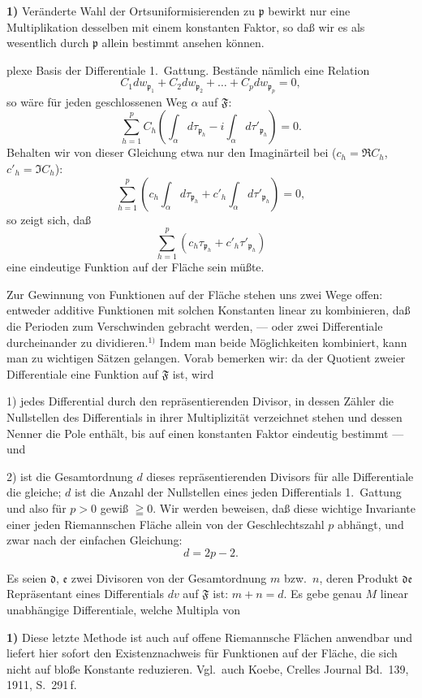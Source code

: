 \documentclass{article}
\begin{document}
\textbf{1)} Veränderte Wahl der Ortsuniformisierenden zu $\mathfrak{p}$ bewirkt nur eine Multiplikation desselben mit einem konstanten Faktor, so daß wir es als wesentlich durch $\mathfrak{p}$ allein bestimmt ansehen können.

plexe Basis der Differentiale 1.\ Gattung. Bestände nämlich eine Relation
\[ C_1 dw_{\mathfrak{p}_1} + C_2 dw_{\mathfrak{p}_2} + \dots + C_p dw_{\mathfrak{p}_p} = 0, \]
so wäre für jeden geschlossenen Weg $\alpha$ auf $\mathfrak{F}$:
\[ \sum_{h=1}^p C_h \left( \int_\alpha d\tau_{\mathfrak{p}_h} - i \int_\alpha d\tau'_{\mathfrak{p}_h} \right) = 0. \]
Behalten wir von dieser Gleichung etwa nur den Imaginärteil bei ($c_h = \Re C_h$, $c'_h = \Im C_h$):
\[ \sum_{h=1}^p \left( c_h \int_\alpha d\tau_{\mathfrak{p}_h} + c'_h \int_\alpha d\tau'_{\mathfrak{p}_h} \right) = 0, \]
so zeigt sich, daß
\[ \sum_{h=1}^p (c_h \tau_{\mathfrak{p}_h} + c'_h \tau'_{\mathfrak{p}_h}) \]
eine eindeutige Funktion auf der Fläche sein müßte.

Zur Gewinnung von Funktionen auf der Fläche stehen uns zwei Wege offen: entweder additive Funktionen mit solchen Konstanten linear zu kombinieren, daß die Perioden zum Verschwinden gebracht werden, --- oder zwei Differentiale durcheinander zu dividieren.${}^{1)}$ Indem man beide Möglichkeiten kombiniert, kann man zu wichtigen Sätzen gelangen. Vorab bemerken wir: da der Quotient zweier Differentiale eine Funktion auf $\mathfrak{F}$ ist, wird

1) jedes Differential durch den repräsentierenden Divisor, in dessen Zähler die Nullstellen des Differentials in ihrer Multiplizität verzeichnet stehen und dessen Nenner die Pole enthält, bis auf einen konstanten Faktor eindeutig bestimmt --- und

2) ist die Gesamtordnung $d$ dieses repräsentierenden Divisors für alle Differentiale die gleiche; $d$ ist die Anzahl der Nullstellen eines jeden Differentials 1.\ Gattung und also für $p > 0$ gewiß $\geqq 0$. Wir werden beweisen, daß diese wichtige Invariante einer jeden Riemannschen Fläche allein von der Geschlechtszahl $p$ abhängt, und zwar nach der einfachen Gleichung:
\[ d = 2p - 2. \]

Es seien $\mathfrak{d}$, $\mathfrak{e}$ zwei Divisoren von der Gesamtordnung $m$ bzw.\ $n$, deren Produkt $\mathfrak{d}\mathfrak{e}$ Repräsentant eines Differentials $dv$ auf $\mathfrak{F}$ ist: $m + n = d$. Es gebe genau $M$ linear unabhängige Differentiale, welche Multipla von

\textbf{1)} Diese letzte Methode ist auch auf offene Riemannsche Flächen anwendbar und liefert hier sofort den Existenznachweis für Funktionen auf der Fläche, die sich nicht auf bloße Konstante reduzieren. Vgl.\ auch Koebe, Crelles Journal Bd.~139, 1911, S.~291\,f.
\end{document}
